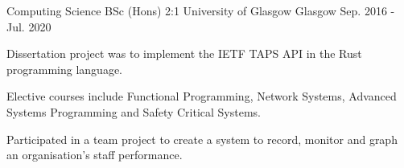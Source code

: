

\begin{cventries}

    \cventry
    {Computing Science BSc (Hons) 2:1} %
    {University of Glasgow} %
    {Glasgow} %
    {Sep. 2016 - Jul. 2020} %
    {
        \begin{cvitems} %
            \item {Dissertation project was to implement the IETF TAPS API in the Rust programming language.}
            \item {Elective courses include Functional Programming, Network Systems, Advanced Systems Programming and Safety Critical Systems.}
            \item {Participated in a team project to create a system to record, monitor and graph an organisation's staff performance.}
        \end{cvitems}
    }

\end{cventries}
